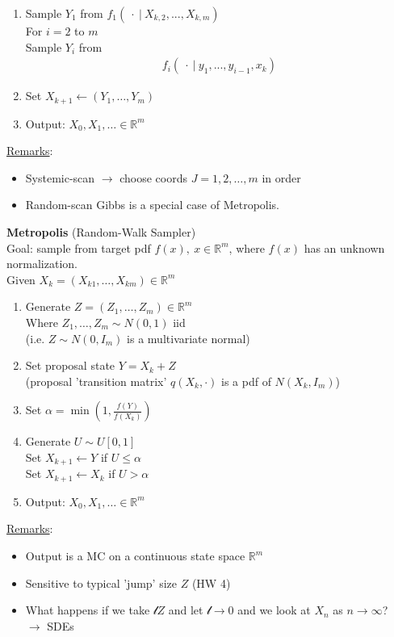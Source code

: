 \documentclass[12pt, letterpaper]{article}
\begin{document}
\begin{enumerate}
    \item Sample $Y_1$ from $f_1 (\ \cdot\ |\ X_{k,2}, ..., X_{k,m})$ \\
    For $i = 2$ to $m$ \\
    Sample $Y_i$ from 
    \begin{align*}
        f_i(\ \cdot\ |\ y_1,..., y_{i-1}, x_k)
    \end{align*}
    \item Set $X_{k+1} \leftarrow (Y_1,\dots, Y_m)$
    \item Output: $X_0, X_1, \dots \in \mathbb{R}^m$
\end{enumerate}
\underline{Remarks}:
\begin{itemize}
    \item Systemic-scan $\rightarrow$ choose coords $J = 1,2,\dots,m$ in order
    \item Random-scan Gibbs is a special case of Metropolis.
\end{itemize}
\textbf{Metropolis} (Random-Walk Sampler)\\
Goal: sample from target pdf $f(x),\ x \in \mathbb{R}^m$, where $f(x)$ has an unknown normalization. \\
Given $X_k = (X_{k1},\dots,X_{km}) \in \mathbb{R}^m$ 
\begin{enumerate}
    \item Generate $Z = (Z_1, \dots, Z_m) \in \mathbb{R}^m$ \\
    Where $Z_1, \dots, Z_m \sim N(0,1)$ iid \\
    (i.e. $Z \sim N(0, I_m)$ is a multivariate normal)
    \item Set proposal state $Y = X_k + Z$ \\
    (proposal 'transition matrix' $q(X_k, \cdot)$ is a pdf of $N(X_k, I_m)$)
    \item Set $\alpha = \min(1, \frac{f(Y)}{f(X_k)})$
    \item Generate $U \sim U[0,1]$ \\
    Set $X_{k+1} \leftarrow Y$ if $U \le \alpha$\\
    Set $X_{k+1} \leftarrow X_k$ if $U > \alpha$
    \item Output: $X_0, X_1,\dots \in \mathbb{R}^m$
\end{enumerate}
\underline{Remarks}:
\begin{itemize}
    \item Output is a MC on a continuous state space $\mathbb{R}^m$
    \item Sensitive to typical 'jump' size $Z$ (HW 4)
    \item What happens if we take $\mathcal{l}Z$ and let $\mathcal{l} \rightarrow 0$
    and we look at $X_n$ as $n \rightarrow \infty$? \\
    $\rightarrow$ SDEs
\end{itemize}
\end{document}
